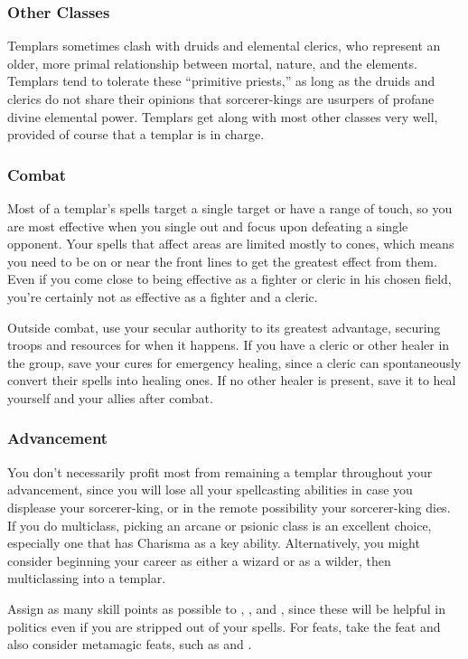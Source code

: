 \subsubsection{Other Classes}
Templars sometimes clash with druids and elemental clerics, who represent an older, more primal relationship between mortal, nature, and the elements. Templars tend to tolerate these ``primitive priests,'' as long as the druids and clerics do not share their opinions that sorcerer-kings are usurpers of profane divine elemental power. Templars get along with most other classes very well, provided of course that a templar is in charge.

\subsubsection{Combat}
Most of a templar's spells target a single target or have a range of touch, so you are most effective when you single out and focus upon defeating a single opponent. Your spells that affect areas are limited mostly to cones,
which means you need to be on or near the front lines to get the greatest effect from them. Even if you come close to being effective as a fighter or cleric in his chosen field, you're certainly not as effective as a fighter and a cleric.

Outside combat, use your secular authority to its greatest advantage, securing troops and resources for when it happens. If you have a cleric or other healer in the group, save your cures for emergency healing, since a cleric can spontaneously convert their spells into healing ones. If no other healer is present, save it to heal yourself and your allies after combat.

\subsubsection{Advancement}
You don't necessarily profit most from remaining a templar throughout your advancement, since you will lose all your spellcasting abilities in case you displease your sorcerer-king, or in the remote possibility your sorcerer-king dies. If you do multiclass, picking an arcane or psionic class is an excellent choice, especially one that has Charisma as a key ability. Alternatively, you might consider beginning your career as either a wizard or as a wilder, then multiclassing into a templar.

Assign as many skill points as possible to , , and , since these will be helpful in politics even if you are stripped out of your spells. For feats, take the  feat and also consider metamagic feats, such as  and .


